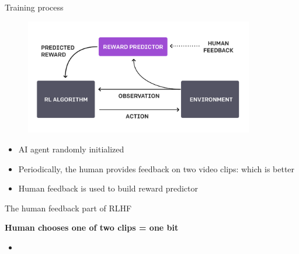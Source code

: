 \begin{vbframe}{Training process}

\vfill

\begin{figure}
\centering
\includegraphics[width = 10cm]{figure/trainingprocess.png}
\end{figure}

\begin{itemize}
	\item AI agent randomly initialized
	\item Periodically, the human provides feedback on
	two video clips: which is better
        \item Human feedback is used to build reward predictor
\end{itemize}

\vfill

\end{vbframe}


\begin{vbframe}{The human feedback part of RLHF}

\vfill

\textbf{Human chooses one of two clips = one bit}

	\begin{itemize}
		\item \href{https://player.vimeo.com/video/754042470?h=e64a40690d&badge=0&autopause=0&player_id=0&app_id=58479}{}

	\end{itemize}

\vfill

\end{vbframe}



